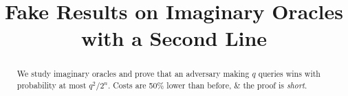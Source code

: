 \documentclass[conference]{IEEEtran}
\begin{document}
\title{Fake Results on Imaginary Oracles\\with a Second Line}
\author{}
\maketitle
\begin{abstract}
We study imaginary oracles and prove that an adversary making $q$ queries wins with probability at most $q^2/2^n$. Costs are 50\% lower than before, \& the proof is \emph{short}. %
\end{abstract}








\appendices

\end{document}

